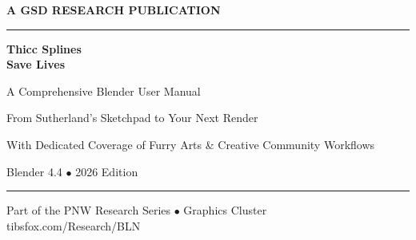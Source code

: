 \documentclass[11pt,letterpaper,twoside,openright]{book}
\begin{document}

\thispagestyle{empty}
\begin{center}
\vspace*{3cm}

{\small\sffamily\textcolor{primary}{\textbf{A GSD RESEARCH PUBLICATION}}}

\vspace{0.5cm}
\textcolor{bordergray}{\rule{10cm}{0.5pt}}

\vspace{2cm}
{\fontsize{36}{42}\selectfont\bfseries\sffamily\textcolor{primary}{Thicc Splines\\[0.4em]Save Lives}}

\vspace{1cm}
{\Large\sffamily\textcolor{secondary}{A Comprehensive Blender User Manual}}

\vspace{0.5cm}
{\large\sffamily\textcolor{tertiary}{From Sutherland's Sketchpad to Your Next Render}}

\vspace{0.5cm}
{\normalsize\sffamily\textcolor{subtlegray}{With Dedicated Coverage of Furry Arts \& Creative Community Workflows}}

\vspace{3cm}
{\sffamily\textcolor{accent}{Blender 4.4 $\bullet$ 2026 Edition}}

\vspace{0.5cm}
\textcolor{bordergray}{\rule{10cm}{0.5pt}}

\vspace{1cm}
{\small\sffamily\textcolor{subtlegray}{Part of the PNW Research Series $\bullet$ Graphics Cluster}}\\[0.3em]
{\small\sffamily\textcolor{subtlegray}{tibsfox.com/Research/BLN}}
\end{center}
\newpage
\end{document}
